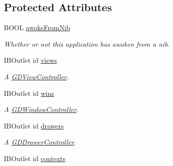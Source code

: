 \subsection*{Protected Attributes}
\begin{DoxyCompactItemize}
\item 
\hypertarget{interface_g_d_application_controller_a102ba452810353ac8e89ebc8cbb6e5c7}{
BOOL \hyperlink{interface_g_d_application_controller_a102ba452810353ac8e89ebc8cbb6e5c7}{awokeFromNib}}
\label{interface_g_d_application_controller_a102ba452810353ac8e89ebc8cbb6e5c7}

\begin{DoxyCompactList}\small\item\em Whether or not this application has awoken from a nib. \item\end{DoxyCompactList}\item 
\hypertarget{interface_g_d_application_controller_af0df472a85cabe1d033dd058c0396d55}{
IBOutlet id \hyperlink{interface_g_d_application_controller_af0df472a85cabe1d033dd058c0396d55}{views}}
\label{interface_g_d_application_controller_af0df472a85cabe1d033dd058c0396d55}

\begin{DoxyCompactList}\small\item\em A \hyperlink{interface_g_d_view_controller}{GDViewController}. \item\end{DoxyCompactList}\item 
\hypertarget{interface_g_d_application_controller_ae4698e32ace2b64232ac1f10206af972}{
IBOutlet id \hyperlink{interface_g_d_application_controller_ae4698e32ace2b64232ac1f10206af972}{wins}}
\label{interface_g_d_application_controller_ae4698e32ace2b64232ac1f10206af972}

\begin{DoxyCompactList}\small\item\em A \hyperlink{interface_g_d_window_controller}{GDWindowController}. \item\end{DoxyCompactList}\item 
\hypertarget{interface_g_d_application_controller_a8fef9df1eb5a6fc1ed86f842de80cc1a}{
IBOutlet id \hyperlink{interface_g_d_application_controller_a8fef9df1eb5a6fc1ed86f842de80cc1a}{drawers}}
\label{interface_g_d_application_controller_a8fef9df1eb5a6fc1ed86f842de80cc1a}

\begin{DoxyCompactList}\small\item\em A \hyperlink{interface_g_d_drawer_controller}{GDDrawerController}. \item\end{DoxyCompactList}\item 
\hypertarget{interface_g_d_application_controller_acd7487a3a40c310be110a7da0cc7e43b}{
IBOutlet id \hyperlink{interface_g_d_application_controller_acd7487a3a40c310be110a7da0cc7e43b}{contexts}}
\label{interface_g_d_application_controller_acd7487a3a40c310be110a7da0cc7e43b}


\end{DoxyCompactItemize}
